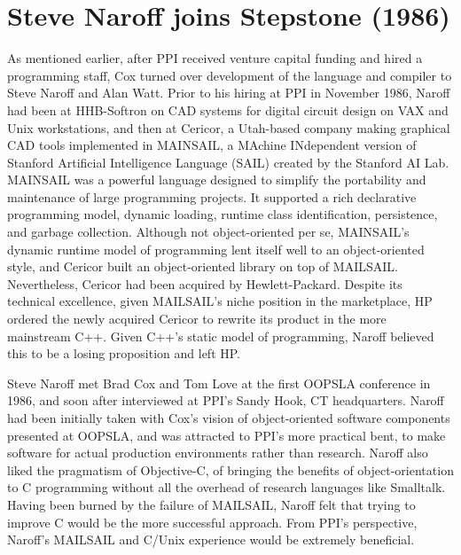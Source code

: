 \documentclass[acmsmall]{acmart}\settopmatter{}
\begin{document}
\section{Steve Naroff joins Stepstone (1986)}
\label{sec-SteveNaroffJoinsStepstone1986}
As mentioned earlier, after PPI received venture capital funding and hired a programming staff, Cox turned over development of the language and compiler to Steve Naroff and Alan Watt. Prior to his hiring at PPI in November 1986, Naroff had been at HHB-Softron on CAD systems for digital circuit design on VAX and Unix workstations, and then at Cericor, a Utah-based company making graphical CAD tools implemented in MAINSAIL, a MAchine INdependent version of Stanford Artificial Intelligence Language (SAIL) created by the Stanford AI Lab. MAINSAIL was a powerful language designed to simplify the portability and maintenance of large programming projects. It supported a rich declarative programming model, dynamic loading, runtime class identification, persistence, and garbage collection. Although not object-oriented per se, MAINSAIL's dynamic runtime model of programming lent itself well to an object-oriented style, and Cericor built an object-oriented library on top of MAILSAIL. Nevertheless, Cericor had been acquired by Hewlett-Packard. Despite its technical excellence, given MAILSAIL's niche position in the marketplace, HP ordered the newly acquired Cericor to rewrite its product in the more mainstream C++. Given C++'s static model of programming, Naroff believed this to be a losing proposition and left HP.

Steve Naroff met Brad Cox and Tom Love at the first OOPSLA conference in 1986, and soon after interviewed at PPI's Sandy Hook, CT headquarters. Naroff had been initially taken with Cox's vision of object-oriented software components presented at OOPSLA, and was attracted to PPI's more practical bent, to make software for actual production environments rather than research. Naroff also liked the pragmatism of Objective-C, of bringing the benefits of object-orientation to C programming without all the overhead of research languages like Smalltalk. Having been burned by the failure of MAILSAIL, Naroff felt that trying to improve C would be the more successful approach. From PPI's perspective, Naroff's MAILSAIL and C/Unix experience would be extremely beneficial.
\end{document}
